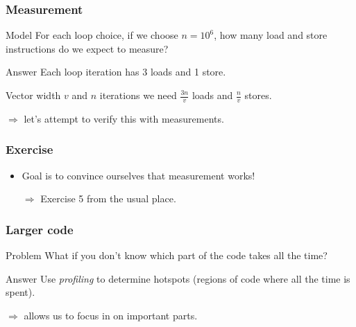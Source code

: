 \documentclass[presentation,aspectratio=43,10pt]{beamer}
\begin{document}
\begin{frame}
  \frametitle{Measurement}
  \begin{challenge}{Model}
    For each loop choice, if we choose $n = 10^6$, how many load
    and store instructions do we expect to measure?
  \end{challenge}
  \pause
  \begin{answer}{Answer}
    Each loop iteration has 3 loads and 1 store.

    Vector width $v$ and $n$ iterations we need $\frac{3n}{v}$ loads
    and $\frac{n}{v}$ stores.

    $\Rightarrow$ let's attempt to verify this with measurements.
  \end{answer}
\end{frame}

\begin{frame}
  \frametitle{Exercise}
  \begin{itemize}
  \item Goal is to convince ourselves that measurement works!
  \item[$\Rightarrow$] Exercise 5 from the usual place.
  \end{itemize}

\end{frame}

\begin{frame}
  \frametitle{Larger code}
  \begin{challenge}{Problem}
    What if you don't know which part of the code takes all the time?
  \end{challenge}
  \begin{answer}{Answer}
    Use \emph{profiling} to determine hotspots (regions of code where
    all the time is spent).

    $\Rightarrow$ allows us to focus in on important parts.
  \end{answer}
\end{frame}
\end{document}
